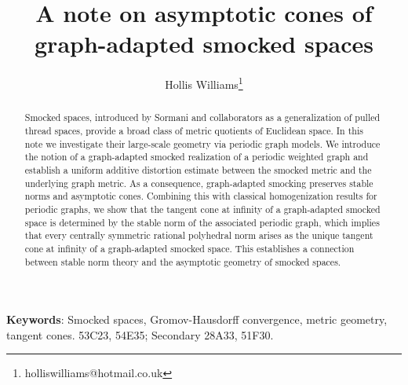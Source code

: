 \documentclass[12pt, letterpaper]{article}
\begin{document}


 
\title{A note on asymptotic cones of graph-adapted smocked spaces}




\author[1,2,3]{Hollis Williams\thanks{holliswilliams@hotmail.co.uk}}




 

\maketitle
 



\begin{abstract}
Smocked spaces, introduced by Sormani and collaborators as a generalization of pulled thread spaces, provide a broad class of metric quotients of Euclidean space. In this note we investigate their large-scale geometry via periodic graph models.  We introduce the notion of a graph-adapted smocked realization of a periodic weighted graph and establish a uniform additive distortion estimate between the smocked metric and the underlying graph metric. As a consequence, graph-adapted smocking preserves stable norms and asymptotic cones. Combining this with classical homogenization results for periodic graphs, we show that the tangent cone at infinity of a graph-adapted smocked space is determined by the stable norm of the associated periodic graph, which implies that every centrally symmetric rational polyhedral norm arises as the unique tangent cone at infinity of a graph-adapted smocked space. This establishes a connection between stable norm theory and the asymptotic geometry of smocked spaces.





\end{abstract}

\textbf{Keywords}: Smocked spaces, Gromov-Hausdorff convergence, metric geometry, tangent cones.
\newline
\newline
\noindent
53C23, 54E35; Secondary 28A33, 51F30.
\end{document}
